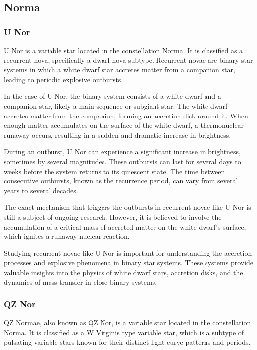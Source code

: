 \subsection{Norma}

\subsubsection*{ U Nor }
U Nor is a variable star located in the constellation Norma. It is classified as a recurrent nova, specifically a dwarf nova subtype. Recurrent novae are binary star systems in which a white dwarf star accretes matter from a companion star, leading to periodic explosive outbursts.

In the case of U Nor, the binary system consists of a white dwarf and a companion star, likely a main sequence or subgiant star. The white dwarf accretes matter from the companion, forming an accretion disk around it. When enough matter accumulates on the surface of the white dwarf, a thermonuclear runaway occurs, resulting in a sudden and dramatic increase in brightness.

During an outburst, U Nor can experience a significant increase in brightness, sometimes by several magnitudes. These outbursts can last for several days to weeks before the system returns to its quiescent state. The time between consecutive outbursts, known as the recurrence period, can vary from several years to several decades.

The exact mechanism that triggers the outbursts in recurrent novae like U Nor is still a subject of ongoing research. However, it is believed to involve the accumulation of a critical mass of accreted matter on the white dwarf's surface, which ignites a runaway nuclear reaction.

Studying recurrent novae like U Nor is important for understanding the accretion processes and explosive phenomena in binary star systems. These systems provide valuable insights into the physics of white dwarf stars, accretion disks, and the dynamics of mass transfer in close binary systems.

\subsubsection*{ QZ Nor }
QZ Normae, also known as QZ Nor, is a variable star located in the constellation Norma. It is classified as a W Virginis type variable star, which is a subtype of pulsating variable stars known for their distinct light curve patterns and periods.

